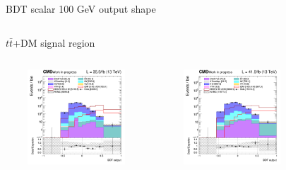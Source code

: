 \documentclass[8pt]{beamer}
\begin{document}
\begin{frame}{BDT scalar 100 GeV output shape}
\vspace{-8pt}
\begin{columns}
\begin{column}{1.09\textwidth}
\begin{block}{\centering $t \bar t$+DM signal region}\end{block} \vspace{10pt}
\end{column}
\end{columns} \vspace{-16pt}
\begin{columns}
		\begin{column}{0.33\textwidth}
			\begin{center}
     			\includegraphics[width=1.0\textwidth, height=100pt]{figs/2016/SmearSR-ttDM-scalar100/log_cratio_topCR_ll_TTbar_BDT_output_scalar100_customBinsAttempt7.png}
    		\end{center}		
		\end{column}
		\begin{column}{0.33\textwidth}
			\begin{center}
     			\includegraphics[width=1.0\textwidth, height=100pt]{figs/2017/SmearSR-ttDM-scalar100/log_cratio_topCR_ll_TTbar_BDT_output_scalar100_customBinsAttempt7.png}
    		\end{center}		
		\end{column}
		\begin{column}{0.33\textwidth}
			\begin{center}

\end{center}
\end{column}
\end{columns}
\end{frame}
\end{document}
